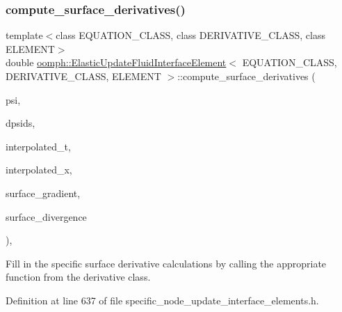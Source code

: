 \subsubsection{\texorpdfstring{compute\+\_\+surface\+\_\+derivatives()}{compute\_surface\_derivatives()}}
{\footnotesize\ttfamily template$<$class E\+Q\+U\+A\+T\+I\+O\+N\+\_\+\+C\+L\+A\+SS, class D\+E\+R\+I\+V\+A\+T\+I\+V\+E\+\_\+\+C\+L\+A\+SS, class E\+L\+E\+M\+E\+NT$>$ \\
double \hyperlink{classoomph_1_1ElasticUpdateFluidInterfaceElement}{oomph\+::\+Elastic\+Update\+Fluid\+Interface\+Element}$<$ E\+Q\+U\+A\+T\+I\+O\+N\+\_\+\+C\+L\+A\+SS, D\+E\+R\+I\+V\+A\+T\+I\+V\+E\+\_\+\+C\+L\+A\+SS, E\+L\+E\+M\+E\+NT $>$\+::compute\+\_\+surface\+\_\+derivatives (\begin{DoxyParamCaption}\item[{const Shape \&}]{psi,  }\item[{const D\+Shape \&}]{dpsids,  }\item[{const Dense\+Matrix$<$ double $>$ \&}]{interpolated\+\_\+t,  }\item[{const Vector$<$ double $>$ \&}]{interpolated\+\_\+x,  }\item[{D\+Shape \&}]{surface\+\_\+gradient,  }\item[{D\+Shape \&}]{surface\+\_\+divergence }\end{DoxyParamCaption})\hspace{0.3cm}{\ttfamily [inline]}, {\ttfamily [protected]}}



Fill in the specific surface derivative calculations by calling the appropriate function from the derivative class. 



Definition at line 637 of file specific\+\_\+node\+\_\+update\+\_\+interface\+\_\+elements.\+h.

\mbox{\label{classoomph_1_1ElasticUpdateFluidInterfaceElement_acc1d5bb57e5664b86a9a76a4cfb8259f}} 
